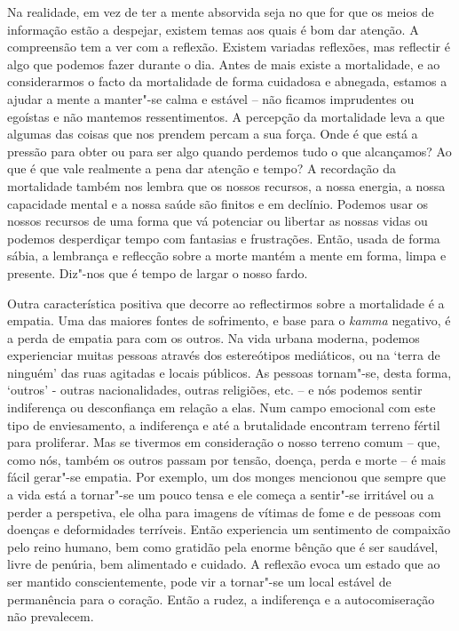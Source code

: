 Na realidade, em vez de ter a mente absorvida seja no que for que os meios de
informação estão a despejar, existem temas aos quais é bom dar
atenção.
A compreensão tem a ver com a reflexão. Existem variadas reflexões, mas
reflectir é algo que podemos fazer durante o dia. Antes de mais existe a
mortalidade, e ao considerarmos o facto da mortalidade de forma cuidadosa e
abnegada, estamos a ajudar a mente a manter"-se calma e estável -- não ficamos
imprudentes ou egoístas e não mantemos ressentimentos. A percepção da
mortalidade leva a que algumas das coisas que nos prendem percam a sua força.
Onde é que está a pressão para obter ou para ser algo quando perdemos tudo o que
alcançamos? Ao que é que vale realmente a pena dar atenção e tempo? A recordação
da mortalidade também nos lembra que os nossos recursos, a nossa energia, a
nossa capacidade mental e a nossa saúde são finitos e em declínio. Podemos usar
os nossos recursos de uma forma que vá potenciar ou libertar as nossas vidas ou
podemos desperdiçar tempo com fantasias e frustrações. Então, usada de forma
sábia, a lembrança e reflecção sobre a morte mantém a mente em forma, limpa e
presente. Diz"-nos que é tempo de largar o nosso fardo.

Outra característica positiva que decorre ao reflectirmos sobre a mortalidade é
a empatia. Uma das maiores fontes de sofrimento, e base para o \emph{kamma}
negativo, é a perda de empatia para com os outros. Na vida urbana moderna,
\mbox{podemos} experienciar muitas pessoas através dos estereótipos mediáticos, ou na
`terra de ninguém' das ruas agitadas e locais públicos. As pessoas tornam"-se,
desta forma, `outros' - outras nacionalidades, outras religiões, etc. -- e nós
podemos sentir indiferença ou desconfiança em relação a elas. Num campo
emocional com este tipo de enviesamento, a indiferença e até a brutalidade
encontram terreno fértil para proliferar. Mas se tivermos em consideração o
nosso terreno comum -- que, como nós, também os outros passam por tensão,
doença, perda e morte -- é mais fácil gerar"-se empatia. Por exemplo, um dos
monges mencionou que sempre que a vida está a tornar"-se um pouco tensa e ele
começa a sentir"-se irritável ou a perder a perspetiva, ele olha para imagens de
vítimas de fome e de pessoas com doenças e deformidades terríveis. Então
experiencia um sentimento de compaixão pelo reino humano, bem como gratidão pela
enorme bênção que é ser saudável, livre de penúria, bem alimentado e cuidado. A
reflexão evoca um estado que ao ser mantido conscientemente, pode vir a
tornar"-se um local estável de permanência para o coração. Então a rudez, a
indiferença e a autocomiseração não prevalecem.

